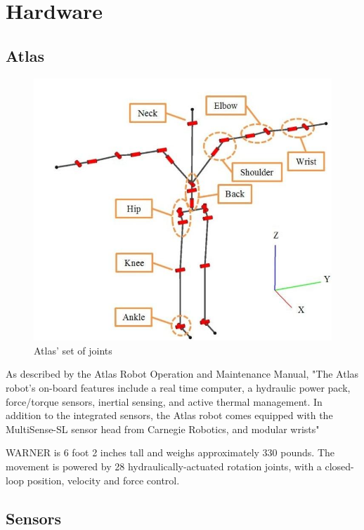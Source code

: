 \documentclass[12pt]{report}
\begin{document}
\section{Hardware}
\subsection{Atlas}
\begin{figure}
  \begin{center}
    \includegraphics[scale=0.2]{images/atlas_joints.png}
  \end{center}
  \caption{Atlas' set of joints}
\end{figure}

As described by the Atlas Robot Operation and Maintenance Manual, "The Atlas robot’s on-board features include a real time computer, a hydraulic power pack, force/torque sensors, inertial sensing, and active thermal management. In addition to the integrated sensors, the Atlas robot comes equipped with the MultiSense-SL sensor head from Carnegie Robotics, and modular wrists"		

WARNER is 6 foot 2 inches tall and weighs approximately 330 pounds. The movement is powered by 28 hydraulically-actuated rotation joints, with a closed-loop position, velocity and force control. 

\subsection{Sensors}
\end{document}
